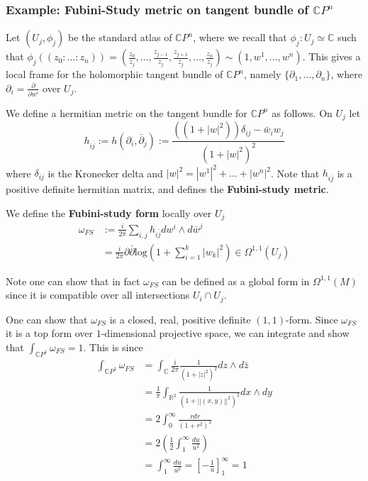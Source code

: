 \documentclass[a4paper]{article}
\theoremstyle{definition} \newtheorem*{definition}{Definition}
\theoremstyle{definition} \newtheorem*{definitions}{Definitions}
\theoremstyle{plain} \newtheorem{theorem}{Theorem}[section]
\theoremstyle{plain} \newtheorem{proposition}[theorem]{Proposition}
\theoremstyle{plain} \newtheorem{corollary}[theorem]{Corollary}
\theoremstyle{plain} \newtheorem{lemma}[theorem]{Lemma}
\theoremstyle{plain} \newtheorem{example}[theorem]{Example}
\newcommand{\defn}[1]{\textbf{#1}}
\newcommand{\realnos}{\mathbb{R}}
\newcommand{\complexnos}{\mathbb{C}}
\begin{document}
\subsubsection{Example: Fubini-Study metric on tangent bundle of $\complexnos P^n$}
Let $(U_j, \phi_j)$ be the standard atlas of $\complexnos P^n$, where we recall that $\phi_j:U_j\simeq \complexnos$ such that $\phi_j((z_0 : \ldots : z_n))=(\frac{z_0}{z_j}, \ldots, \frac{z_{j-1}}{z_j}, \frac{z_{j+1}}{z_j}, \ldots, \frac{z_n}{z_j})\sim (1, w^1, \ldots, w^n)$. This gives a local frame for the holomorphic tangent bundle of $\complexnos P^n$, namely $\{\partial_1, \ldots, \partial_n\}$, where $\partial_i=\frac{\partial}{\partial w^i}$ over $U_j$. 

We define a hermitian metric on the tangent bundle for $\complexnos P^n$ as follows. On $U_j$ let
$$h_{i\bar{j}}:=h(\partial_i,\bar{\partial}_j):=\frac{((1+|w|^2))\delta_{ij}-\bar{w}
_i w_j}{(1+|w|^2)^2}$$
where $\delta_{ij}$ is the Kronecker delta and $|w|^2 = |w^1|^2 + \ldots + |w^n|^2$. Note that $h_{i\bar{j}}$ is a positive definite hermitian matrix, and defines the \defn{Fubini-study metric}. 

We define the \defn{Fubini-study form} locally over $U_j$
\begin{align*}
    \omega_{FS} & := \frac{i}{2\pi} \sum_{i, j} h_{i\bar{j}} dw^i \wedge d\bar{w}^j \\
 & = \frac{i}{2\pi} \partial \bar{\partial} \text{log} \left( 1 + \sum_{i=1}^k |w_k|^2  \right) \in \Omega^{1,1}(U_j)
\end{align*}


Note one can show that in fact $\omega_{FS}$ can be defined as a global form in $\Omega^{1,1}(M)$ since it is compatible over all intersections $U_i\cap U_j$. 

One can show that $\omega_{FS}$ is a closed, real, positive definite $(1,1)$-form. Since $\omega_{FS}$ it is a top form over $1$-dimensional projective space, we can integrate and show that $\int_{\complexnos P^1} \omega_{FS}=1$. This is since
\begin{align*}
  \int_{\complexnos P^1} \omega_{FS} & = \int_\complexnos \frac{i}{2\pi}\frac{1}{(1+|z|^2)^2}dz\wedge d\bar{z}\\
  & = \frac{1}{\pi}\int_{\realnos^2}\frac{1}{(1+||(x,y)||^2)^2}dx\wedge dy \\
  & = 2 \int_0^\infty \frac{rdr}{(1+r^2)^2} \\
  & = 2 \left( \frac{1}{2} \int_1^\infty \frac{du}{u^2 }\right) \\
  & = \int_1^\infty \frac{du}{u^2}  = \left[ - \frac{1}{u} \right]_1^\infty = 1
\end{align*}
\end{document}
